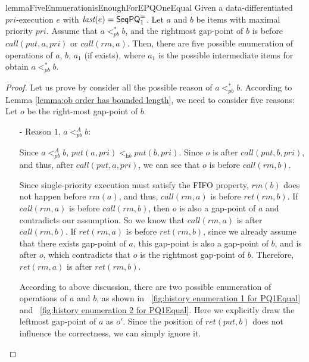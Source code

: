 \begin{restatable}{lemma}{FiveEnmuerationisEnoughForEPQOneEqual}
\label{lemma:five enumeration is enough for EPQ1Equal}
Given a data-differentiated $\textit{pri}$-execution $e$ with $\textit{last}(e) = \mathsf{SeqPQ}_1^{=}$. Let $a$ and $b$ be items with maximal priority $\textit{pri}$. Assume that $a <_{\textit{pb}}^* b$, and the rightmost gap-point of $b$ is before $\textit{call}(\textit{put},a,\textit{pri})$ or $\textit{call}(\textit{rm},a)$. Then, there are five possible enumeration of operations of $a$, $b$, $a_1$ (if exists), where $a_1$ is the possible intermediate items for obtain $a <_{\textit{pb}}^* b$.
\end{restatable}
\begin {proof}

Let us prove by consider all the possible reason of $a <_{\textit{pb}}^* b$. According to Lemma \ref{lemma:ob order has bounded length}, we need to consider five reasons: Let $o$ be the right-most gap-point of $b$.

\begin{itemize}
\setlength{\itemsep}{0.5pt}
\item[-] Reason $1$, $a <_{\textit{pb}}^A b$:

    Since $a <_{\textit{pb}}^A b$, $\textit{put}(a,\textit{pri}) <_{\textit{hb}} \textit{put}(b,\textit{pri})$. Since $o$ is after $\textit{call}(\textit{put},b,\textit{pri})$, and thus, after $\textit{call}(\textit{put},a,\textit{pri})$, we can see that $o$ is before $\textit{call}(\textit{rm},b)$.

    Since single-priority execution must satisfy the FIFO property, $\textit{rm}(b)$ does not happen before $\textit{rm}(a)$, and thus, $\textit{call}(\textit{rm},a)$ is before $\textit{ret}(\textit{rm},b)$. If $\textit{call}(\textit{rm},a)$ is before $\textit{call}(\textit{rm},b)$, then $o$ is also a gap-point of $a$ and contradicts our assumption. So we know that $\textit{call}(\textit{rm},a)$ is after $\textit{call}(\textit{rm},b)$. If $\textit{ret}(\textit{rm},a)$ is before $\textit{ret}(\textit{rm},b)$, since we already assume that there exists gap-point of $a$, this gap-point is also a gap-point of $b$, and is after $o$, which contradicts that $o$ is the rightmost gap-point of $b$. Therefore, $\textit{ret}(\textit{rm},a)$ is after $\textit{ret}(\textit{rm},b)$.

    According to above discussion, there are two possible enumeration of operations of $a$ and $b$, as shown in \figurename~\ref{fig:history enumeration 1 for PQ1Equal} and \figurename~\ref{fig:history enumeration 2 for PQ1Equal}. Here we explicitly draw the leftmost gap-point of $a$ as $o'$. Since the position of $\textit{ret}(\textit{put},b)$ does not influence the correctness, we can simply ignore it.


\end{itemize}
\end{proof}
